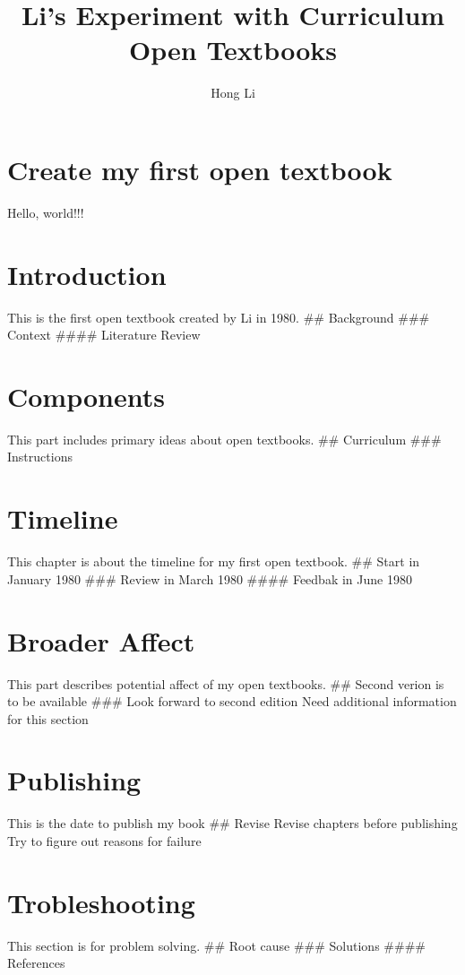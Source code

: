 \documentclass[
  openany]{book}
\title{Li's Experiment with Curriculum Open Textbooks}
\author{Hong Li}
\date{}
\begin{document}
\maketitle

{
\setcounter{tocdepth}{1}
\tableofcontents
}
\chapter{Create my first open textbook}\label{create-my-first-open-textbook}

Hello, world!!!

\chapter{Introduction}\label{introduction}

This is the first open textbook created by Li in 1980.
\#\# Background
\#\#\# Context
\#\#\#\# Literature Review

\chapter{Components}\label{components}

This part includes primary ideas about open textbooks.
\#\# Curriculum
\#\#\# Instructions

\chapter{Timeline}\label{timeline}

This chapter is about the timeline for my first open textbook.
\#\# Start in January 1980
\#\#\# Review in March 1980
\#\#\#\# Feedbak in June 1980

\chapter{Broader Affect}\label{broader-affect}

This part describes potential affect of my open textbooks.
\#\# Second verion is to be available
\#\#\# Look forward to second edition
Need additional information for this section

\chapter{Publishing}\label{publishing}

This is the date to publish my book
\#\# Revise
Revise chapters before publishing
Try to figure out reasons for failure

\chapter{Trobleshooting}\label{trobleshooting}

This section is for problem solving.
\#\# Root cause
\#\#\# Solutions
\#\#\#\# References
\end{document}
